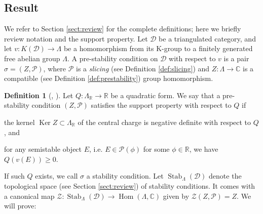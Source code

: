 \documentclass[leqno,11pt,twoside]{amsart}
\theoremstyle{definition}
\newtheorem{Def}[Thm]{Definition}
\begin{document}
\subsection*{Result}
We refer to Section \ref{sect:review} for the complete definitions; here we briefly
review notation and the support property. Let ${\ensuremath{\mathcal D}}$ be a triangulated category, and let
$v \colon K({\ensuremath{\mathcal D}}) \to \Lambda$ be a homomorphism from its K-group to a finitely generated free
abelian group $\Lambda$. A pre-stability condition on ${\ensuremath{\mathcal D}}$ with respect to $v$ is a pair
$\sigma = (Z, {\ensuremath{\mathcal P}})$, where
${\ensuremath{\mathcal P}}$ is a \emph{slicing} (see Definition \ref{def:slicing}) and 
$Z \colon \Lambda \to {\ensuremath{\mathbb{C}}}$ is a compatible (see Definition \ref{def:prestability}) group homomorphism.

\begin{Def}[{\cite{Bridgeland:Stab}, \cite{Kontsevich-Soibelman:stability}}]
\label{def:supportproperty}
Let $Q \colon \Lambda_{\ensuremath{\mathbb{R}}} \to {\ensuremath{\mathbb{R}}}$ be a quadratic form. We say that a pre-stability condition $(Z,
{\ensuremath{\mathcal P}})$ satisfies the support property with respect to $Q$ if 
\begin{enumerate*}
\item \label{item:QKerneg} 
the kernel ${\mathop{\mathrm{Ker}}\nolimits} Z \subset \Lambda_{\ensuremath{\mathbb{R}}}$ of the central charge is negative definite with respect to $Q$, and
\item \label{item:QEnonneg}
for any semistable object $E$, i.e. $E \in {\ensuremath{\mathcal P}}(\phi)$ for some $\phi \in {\ensuremath{\mathbb{R}}}$, we have
$Q(v(E)) \ge 0$.
\end{enumerate*}
\end{Def}
If such $Q$ exists, we call $\sigma$ a stability condition. Let ${\mathop{\mathrm{Stab}}\nolimits}_\Lambda({\ensuremath{\mathcal D}})$ denote the
topological space (see Section \ref{sect:review}) of stability conditions. It comes with a canonical
map ${\ensuremath{\mathcal Z}} \colon {\mathop{\mathrm{Stab}}\nolimits}_\Lambda({\ensuremath{\mathcal D}}) \to {\mathop{\mathrm{Hom}}\nolimits}(\Lambda, {\ensuremath{\mathbb{C}}})$ given by
${\ensuremath{\mathcal Z}}(Z, {\ensuremath{\mathcal P}}) = Z$. 
We will prove:
\end{document}
